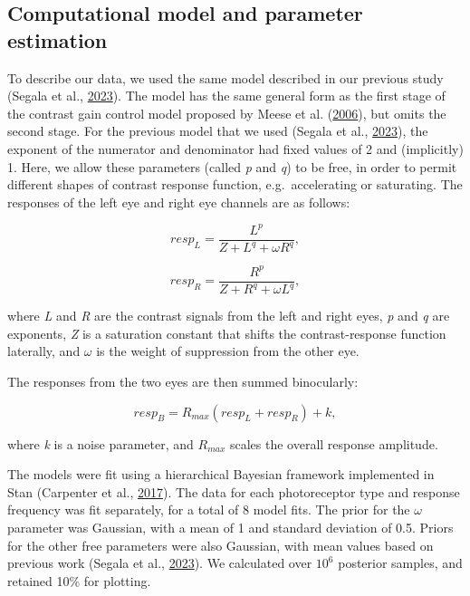\documentclass[
]{article}
\begin{document}
\hypertarget{computational-model-and-parameter-estimation}{%
\subsection{Computational model and parameter estimation}\label{computational-model-and-parameter-estimation}}

To describe our data, we used the same model described in our previous study (Segala et al., \protect\hyperlink{ref-Segala2023}{2023}). The model has the same general form as the first stage of the contrast gain control model proposed by Meese et al. (\protect\hyperlink{ref-Meese2006}{2006}), but omits the second stage. For the previous model that we used (Segala et al., \protect\hyperlink{ref-Segala2023}{2023}), the exponent of the numerator and denominator had fixed values of 2 and (implicitly) 1. Here, we allow these parameters (called \emph{p} and \emph{q}) to be free, in order to permit different shapes of contrast response function, e.g.~accelerating or saturating. The responses of the left eye and right eye channels are as follows:

\begin{equation}
\label{eq:respL}
resp_L = \frac{L^p}{Z + L^q + \omega R^q},
\end{equation}

\begin{equation}
\label{eq:respR}
resp_R = \frac{R^p}{Z + R^q + \omega L^q},
\end{equation}

\noindent where \emph{L} and \emph{R} are the contrast signals from the left and right eyes, \emph{p} and \emph{q} are exponents, \emph{Z} is a saturation constant that shifts the contrast-response function laterally, and \(\omega\) is the weight of suppression from the other eye.

The responses from the two eyes are then summed binocularly:

\begin{equation}
\label{eq:respB}
resp_B = R_{max}(resp_L + resp_R) + k,
\end{equation}

\noindent where \emph{k} is a noise parameter, and \(R_{max}\) scales the overall response amplitude.

The models were fit using a hierarchical Bayesian framework implemented in Stan (Carpenter et al., \protect\hyperlink{ref-Carpenter2017}{2017}). The data for each photoreceptor type and response frequency was fit separately, for a total of 8 model fits. The prior for the \(\omega\) parameter was Gaussian, with a mean of 1 and standard deviation of 0.5. Priors for the other free parameters were also Gaussian, with mean values based on previous work (Segala et al., \protect\hyperlink{ref-Segala2023}{2023}). We calculated over \ensuremath{10^{6}} posterior samples, and retained 10\% for plotting.
\end{document}
